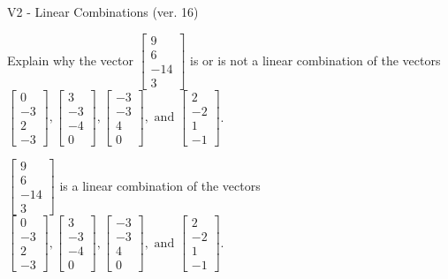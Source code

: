 \begin{exercise}
  \begin{exerciseTitle}V2 - Linear Combinations (ver. 16)\end{exerciseTitle}
  \begin{exerciseStatement}
    Explain why the vector \(\left[\begin{array}{c}
9 \\
6 \\
-14 \\
3
\end{array}\right]\)  is or is not a linear 
	combination of the vectors \(\left[\begin{array}{c}
0 \\
-3 \\
2 \\
-3
\end{array}\right] , \left[\begin{array}{c}
3 \\
-3 \\
-4 \\
0
\end{array}\right] , \left[\begin{array}{c}
-3 \\
-3 \\
4 \\
0
\end{array}\right] , \text{ and } \left[\begin{array}{c}
2 \\
-2 \\
1 \\
-1
\end{array}\right]\).
	


  \end{exerciseStatement}
  \begin{exerciseAnswer}
   \(\left[\begin{array}{c}
9 \\
6 \\
-14 \\
3
\end{array}\right]\) 
  	 is  
	a linear combination of the vectors \(\left[\begin{array}{c}
0 \\
-3 \\
2 \\
-3
\end{array}\right] , \left[\begin{array}{c}
3 \\
-3 \\
-4 \\
0
\end{array}\right] , \left[\begin{array}{c}
-3 \\
-3 \\
4 \\
0
\end{array}\right] , \text{ and } \left[\begin{array}{c}
2 \\
-2 \\
1 \\
-1
\end{array}\right]\).


\end{exerciseAnswer}
\end{exercise}
